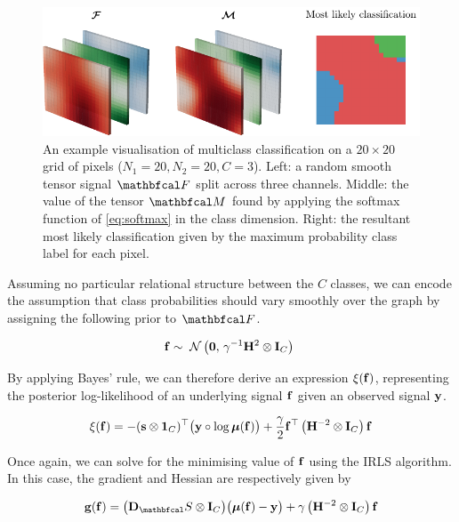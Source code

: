 \begin{figure}[t]  
    \begin{center}
        \includegraphics[width=\linewidth]{Figures/multiclass.pdf}
    \end{center}
   \caption[Visualisation of multiclass classification on a 2D lattice]{An example visualisation of multiclass classification on a $20 \times 20$ grid of pixels ($N_1 = 20, N_2 = 20, C=3$). Left: a random smooth tensor signal $\Ft$ split across three channels. Middle: the value of the tensor $\Mt$ found by applying the softmax function of \cref{eq:softmax} in the class dimension. Right: the resultant most likely classification given by the maximum probability class label for each pixel. } 
    \label{fig:logistic_gsr_multiclass}
\end{figure} 


Assuming no particular relational structure between the $C$ classes, we can encode the assumption that class probabilities should vary smoothly over the graph by assigning the following prior to $\Ft$. 

\begin{equation}
    \mathbf{f} \sim \; \mathcal{N}\left(\mathbf{0}, \, \gamma^{-1} \mathbf{H}^2 \otimes \mathbf{I}_C\right) \;
\end{equation}

By applying Bayes' rule, we can therefore derive an expression $\xi(\mathbf{f})$, representing the posterior log-likelihood of an underlying signal $\mathbf{f}$ given an observed signal $\mathbf{y}$. 

\begin{equation}
    \xi(\mathbf{f}) = - (\mathbf{s} \otimes \mathbf{1}_C)^\top \big(\mathbf{y} \circ \log \boldsymbol{\mu}(\mathbf{f}) \big) + \frac{\gamma}{2} \mathbf{f}^\top \left(\mathbf{H}^{-2} \otimes \mathbf{I}_C\right) \mathbf{f}
\end{equation}

Once again, we can solve for the minimising value of $\mathbf{f}$ using the IRLS algorithm. In this case, the gradient and Hessian are respectively given by 

\begin{equation}
    \g(\f) = \big(\D_\St \otimes \I_C\big) \big(\muu(\f) - \y\big) + \gamma \left(\HH^{-2} \otimes \I_C\right) \f
\end{equation}

